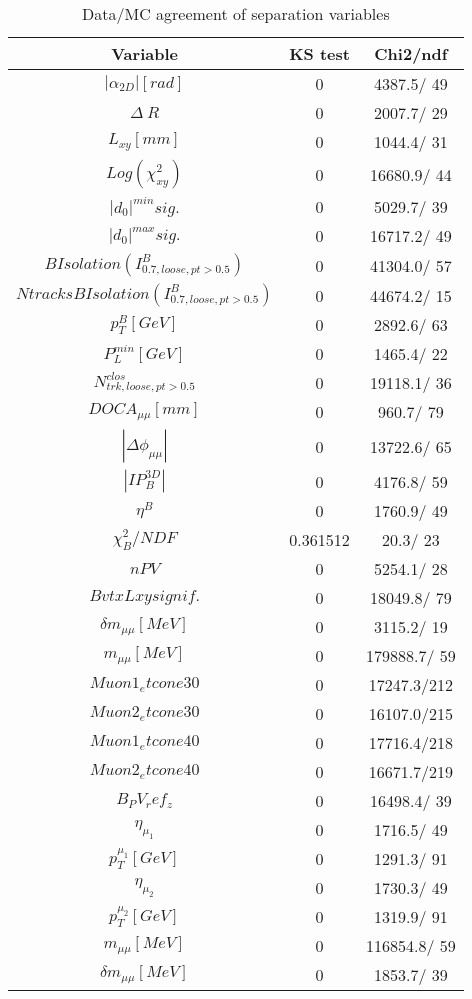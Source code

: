 \documentclass{article}
\begin{document}
\begin{table}[htbp]
\caption{\label{tab:sepVars}Data/MC agreement of separation variables}
\begin{center}
\begin{tabular}{c|c|c}
Variable & KS test & Chi2/ndf \\
\hline
$|\alpha_{2D}| [rad]$ & 0 & 4387.5/ 49\\
\hline
$\Delta~R$ & 0 & 2007.7/ 29\\
\hline
$L_{xy} [mm]$ & 0 & 1044.4/ 31\\
\hline
$Log(\chi^{2}_{xy})$ & 0 & 16680.9/ 44\\
\hline
$|d_{0}|^{min} sig.$ & 0 & 5029.7/ 39\\
\hline
$|d_{0}|^{max} sig.$ & 0 & 16717.2/ 49\\
\hline
$B Isolation (I^{B}_{0.7, loose, pt>0.5})$ & 0 & 41304.0/ 57\\
\hline
$Ntracks B Isolation (I^{B}_{0.7, loose, pt>0.5})$ & 0 & 44674.2/ 15\\
\hline
$p_{T}^{B} [GeV]$ & 0 & 2892.6/ 63\\
\hline
$P^{min}_{L} [GeV]$ & 0 & 1465.4/ 22\\
\hline
$N^{clos}_{trk, loose, pt>0.5}$ & 0 & 19118.1/ 36\\
\hline
$DOCA_{\mu\mu} [mm]$ & 0 & 960.7/ 79\\
\hline
$|\Delta\phi_{\mu\mu}|$ & 0 & 13722.6/ 65\\
\hline
$|IP_{B}^{3D}|$ & 0 & 4176.8/ 59\\
\hline
$\eta^{B}$ & 0 & 1760.9/ 49\\
\hline
$\chi^{2}_{B}/NDF$ & 0.361512 &  20.3/ 23\\
\hline
$nPV$ & 0 & 5254.1/ 28\\
\hline
$BvtxLxy signif.$ & 0 & 18049.8/ 79\\
\hline
$\delta m_{\mu\mu} [MeV]$ & 0 & 3115.2/ 19\\
\hline
$m_{\mu\mu} [MeV]$ & 0 & 179888.7/ 59\\
\hline
$Muon1_etcone30$ & 0 & 17247.3/212\\
\hline
$Muon2_etcone30$ & 0 & 16107.0/215\\
\hline
$Muon1_etcone40$ & 0 & 17716.4/218\\
\hline
$Muon2_etcone40$ & 0 & 16671.7/219\\
\hline
$B_PV_ref_z$ & 0 & 16498.4/ 39\\
\hline
$\eta_{\mu_{1}}$ & 0 & 1716.5/ 49\\
\hline
$p_{T}^{\mu_{1}} [GeV]$ & 0 & 1291.3/ 91\\
\hline
$\eta_{\mu_{2}}$ & 0 & 1730.3/ 49\\
\hline
$p_{T}^{\mu_{2}} [GeV]$ & 0 & 1319.9/ 91\\
\hline
$m_{\mu\mu} [MeV]$ & 0 & 116854.8/ 59\\
\hline
$\delta m_{\mu\mu} [MeV]$ & 0 & 1853.7/ 39\\
\hline
\end{tabular}
\end{center}
\end{table}
\end{document}
